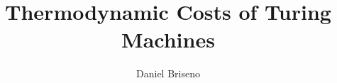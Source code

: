 \documentclass{beamer}
\title{Thermodynamic Costs of Turing Machines \parencite{Kolchinsky_2020}}
\author{Daniel Briseno}
\begin{document}
\frame{\titlepage}







\end{document}
